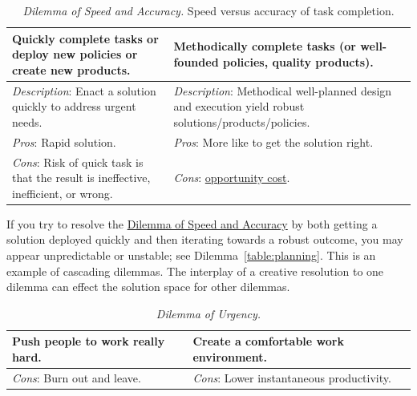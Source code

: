 \begin{center}
\begin{table}[H] %
\begin{tabular}{ | m{\dilemmatablewidth}| m{\dilemmatablewidth} | } 
  \hline
  \textbf{Quickly complete tasks or deploy new policies or create new products.} & 
  \textbf{Methodically complete tasks (or well-founded policies, quality products).} \\ 
  \hline
  \textit{Description}: Enact a solution quickly to address urgent needs. &
  \textit{Description}: Methodical well-planned design and execution yield robust solutions/products/policies. \\
  \hline
  \textit{Pros}: Rapid solution. &
  \textit{Pros}: More like to get the solution right. \\
  \hline
  \textit{Cons}: Risk of quick task is that the result is ineffective, inefficient, or wrong. &
  \textit{Cons}: \href{https://en.wikipedia.org/wiki/Opportunity_cost}{opportunity cost}. 
  \index{Wikipedia!\href{https://en.wikipedia.org/wiki/Opportunity_cost}{opportunity cost}}
  \\  
  \hline
\end{tabular}
\caption{
\textit{Dilemma of Speed and Accuracy.}
Speed versus accuracy of task completion.
}
\label{table:quick-methodical}
\end{table}
\end{center}

If you try to resolve the \href{table:quick-methodical}{Dilemma of Speed and Accuracy} by both getting a solution deployed quickly and then iterating towards a robust outcome, you may appear unpredictable or unstable; see Dilemma~\ref{table:planning}. This is an example of cascading dilemmas. The interplay of a creative resolution to one dilemma can effect the solution space for other dilemmas. 



\begin{center}
\begin{table}[H] %
\begin{tabular}{ | m{\dilemmatablewidth}| m{\dilemmatablewidth} | } 
  \hline
  \textbf{Push people to work really hard.} & 
  \textbf{Create a comfortable work environment.} \\ 
  \hline
  \textit{Cons}: Burn out and leave. & 
  \textit{Cons}: Lower instantaneous productivity. \\  
  \hline
\end{tabular}
\caption{
\textit{Dilemma of Urgency.}
}
\label{table:rate-of-work}
\end{table}
\end{center}

